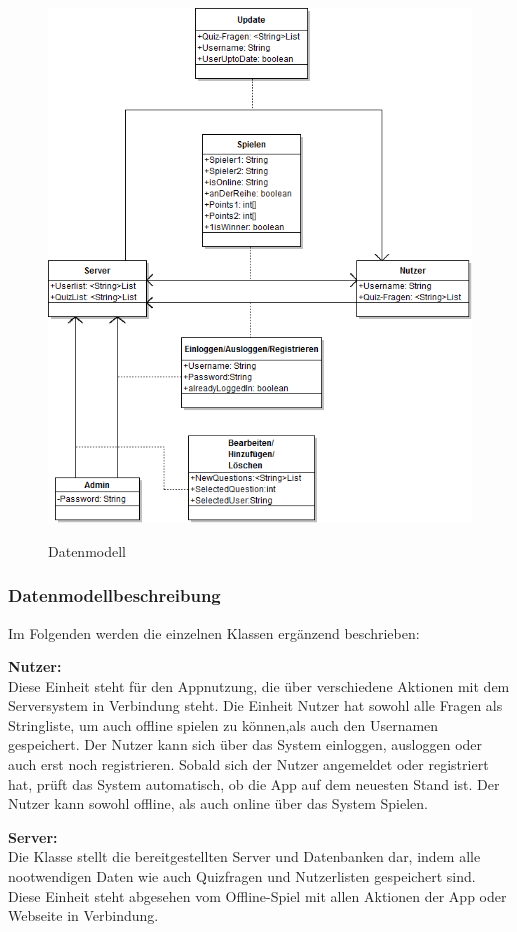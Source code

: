 \documentclass[fontsize=12pt,paper=a4,twoside]{scrartcl}
\begin{document}
\begin{figure}
	[H] \caption{Datenmodell} 
	\includegraphics[width=0.8
	\textwidth]{Bilder/datenmodell_final.png} \label{datenmodell} 
\end{figure}

\subsubsection{Datenmodellbeschreibung}

Im Folgenden werden die einzelnen Klassen ergänzend beschrieben:

\textbf{Nutzer:}\\
Diese Einheit steht für den Appnutzung, die über verschiedene Aktionen
mit dem Serversystem in Verbindung steht. Die Einheit Nutzer hat sowohl 
alle Fragen als Stringliste, um auch offline spielen zu können,als auch 
den Usernamen gespeichert. 
Der Nutzer kann sich über das System einloggen, ausloggen oder auch erst noch 
registrieren.
Sobald sich der Nutzer angemeldet oder registriert hat, prüft das System automatisch,
ob die App auf dem neuesten Stand ist. Der Nutzer kann sowohl offline, als auch online 
über das System Spielen.

\textbf{Server:}\\
Die Klasse stellt die bereitgestellten Server und Datenbanken dar, indem alle 
nootwendigen Daten wie auch Quizfragen und Nutzerlisten gespeichert sind. Diese Einheit
steht abgesehen vom Offline-Spiel mit allen Aktionen der App oder Webseite in Verbindung.
\end{document}

